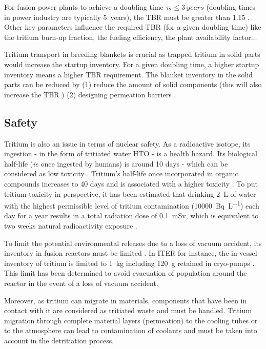 For fusion power plants to achieve a doubling time $\tau_2 \leq \SI{3}{years}$ (doubling times in power industry are typically \SI{5}{years}), the TBR must be greater than 1.15 .
Other key parameters influence the required TBR (for a given doubling time) like the tritium burn-up fraction, the fueling efficiency, the plant availability factor...

Tritium transport in breeding blankets is crucial as trapped tritium in solid parts would increase the startup inventory.
For a given doubling time, a higher startup inventory means a higher TBR requirement.
The blanket inventory in the solid parts can be reduced by (1) reduce the amount of solid components (this will also increase the TBR \cite{shimwell_multiphysics_2019}) (2) designing permeation barriers .

\subsection{Safety}
Tritium is also an issue in terms of nuclear safety.
As a radioactive isotope, its ingestion - in the form of tritiated water HTO - is a health hazard.
Its biological half-life (\textit{ie} once ingested by humans) is around 10 days - which can be considered as low toxicity .
Tritium's half-life once incorporated in organic compounds increases to 40 days and is associated with a higher toxicity \cite{bridges_review_2007}.
To put tritium toxicity in perspective, it has been estimated that drinking \SI{2}{L} of water with the highest permissible level of tritium contamination (\SI{10000}{Bq.L^{-1}}) each day for a year results in a total radiation dose of \SI{0.1}{mSv}, which is equivalent to two weeks natural radioactivity exposure .

To limit the potential environmental releases due to a loss of vacuum accident, its inventory in fusion reactors must be limited .
In ITER for instance, the in-vessel inventory of tritium is limited to \SI{1}{kg} including \SI{120}{g} retained in cryo-pumps .
This limit has been determined to avoid evacuation of population around the reactor in the event of a loss of vacuum accident.

Moreover, as tritium can migrate in materials, components that have been in contact with it are considered as tritiated waste and must be handled.
Tritium migration through complete material layers (permeation) to the cooling tubes  or to the atmosphere can lead to contamination of coolants and must be taken into account in the detritiation process.

